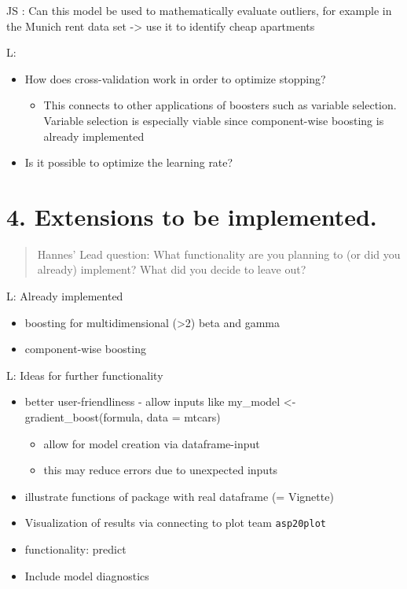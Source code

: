 \documentclass[
]{report}
\providecommand{\tightlist}{%
  \setlength{\itemsep}{0pt}\setlength{\parskip}{0pt}}
\begin{document}
JS : Can this model be used to mathematically evaluate outliers, for
example in the Munich rent data set -\textgreater{} use it to identify
cheap apartments

L:

\begin{itemize}
\tightlist
\item
  How does cross-validation work in order to optimize stopping?

  \begin{itemize}
  \tightlist
  \item
    This connects to other applications of boosters such as variable
    selection. Variable selection is especially viable since
    component-wise boosting is already implemented
  \end{itemize}
\item
  Is it possible to optimize the learning rate?
\end{itemize}

\hypertarget{extensions-to-be-implemented.}{%
\chapter{4. Extensions to be
implemented.}\label{extensions-to-be-implemented.}}

\begin{quote}
Hannes' Lead question: What functionality are you planning to (or did
you already) implement? What did you decide to leave out?
\end{quote}

L: Already implemented

\begin{itemize}
\tightlist
\item
  boosting for multidimensional (\textgreater2) beta and gamma
\item
  component-wise boosting
\end{itemize}

L: Ideas for further functionality

\begin{itemize}
\tightlist
\item
  better user-friendliness - allow inputs like my\_model \textless-
  gradient\_boost(formula, data = mtcars)

  \begin{itemize}
  \tightlist
  \item
    allow for model creation via dataframe-input
  \item
    this may reduce errors due to unexpected inputs
  \end{itemize}
\item
  illustrate functions of package with real dataframe (= Vignette)
\item
  Visualization of results via connecting to plot team
  \texttt{asp20plot}
\item
  functionality: predict
\item
  Include model diagnostics
\end{itemize}
\end{document}
